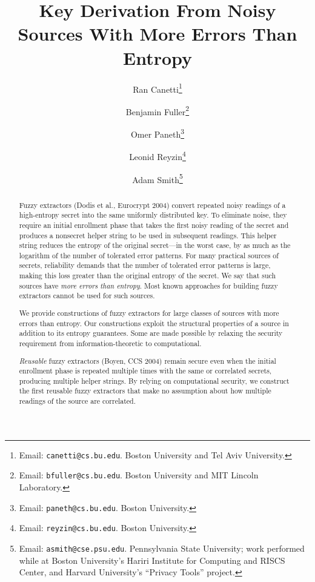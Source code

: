 \documentclass[11pt]{article}
\title{Key Derivation From Noisy Sources With More Errors Than Entropy}
\author{Ran Canetti\footnote{Email: {\tt canetti@cs.bu.edu}. Boston University and Tel Aviv University.} \and Benjamin Fuller\footnote{Email: {\tt bfuller@cs.bu.edu}.  Boston University and MIT Lincoln Laboratory.} \and Omer Paneth\footnote{Email: {\tt paneth@cs.bu.edu}. Boston University.} \and Leonid Reyzin\footnote{Email: {\tt reyzin@cs.bu.edu}.  Boston University.} \and Adam Smith\footnote{Email: {\tt asmith@cse.psu.edu}.  Pennsylvania State University; work performed while at Boston University's Hariri Institute for Computing and RISCS Center, and Harvard University's
``Privacy Tools'' project.} }
\begin{document}
\maketitle


\begin{abstract}
Fuzzy extractors (Dodis et al., Eurocrypt 2004) convert repeated noisy readings of a high-entropy secret into the same uniformly distributed key. To eliminate noise, they require an initial enrollment phase that takes the first noisy reading of the secret and produces a nonsecret helper string to be used in subsequent readings. This helper string reduces  the entropy of the original secret---in the worst case, by as much as the logarithm of the number of tolerated error patterns. For many practical sources of secrets, reliability demands that the number of tolerated error patterns is large, making this loss greater than the original entropy of the secret. We say that such sources have \emph{more errors than entropy}.  Most known approaches for building fuzzy extractors cannot be used for such sources.

%   

We provide constructions of fuzzy extractors for large classes of sources with more errors than entropy.  Our constructions exploit the structural properties of a source in addition to its entropy guarantees. Some are made possible by relaxing the security requirement from information-theoretic to computational.


\emph{Reusable} fuzzy extractors (Boyen, CCS 2004)
 remain secure even when the initial enrollment phase is repeated multiple times with the same or correlated secrets, producing multiple helper strings. By relying on computational security, we construct the first reusable fuzzy extractors that make no assumption about how multiple readings of the source are correlated.



\end{abstract}
\end{document}
